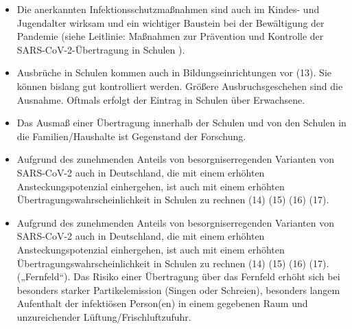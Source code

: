 \documentclass{article}
\begin{document}
\begin{itemize}
\item Die anerkannten Infektionsschutzmaßnahmen sind auch im Kindes- und Jugendalter wirksam und ein wichtiger Baustein bei der Bewältigung der Pandemie (siehe Leitlinie: Maßnahmen zur Prävention und Kontrolle der SARS-CoV-2-Übertragung in Schulen\protect\footnotemark{} ).


\item Ausbrüche in Schulen kommen auch in Bildungseinrichtungen vor (13). Sie können bislang gut kontrolliert werden. Größere Ausbruchsgeschehen sind die Ausnahme. Oftmals erfolgt der Eintrag in Schulen über Erwachsene.


\item Das Ausmaß einer Übertragung innerhalb der Schulen und von den Schulen in die Familien/Haushalte ist Gegenstand der Forschung.


\item Aufgrund des zunehmenden Anteils von besorgniserregenden Varianten von SARS-CoV-2 auch in Deutschland, die mit einem erhöhten Ansteckungspotenzial einhergehen, ist auch mit einem erhöhten Übertragungswahrscheinlichkeit in Schulen zu rechnen (14) (15) (16) (17).


\item Aufgrund des zunehmenden Anteils von besorgniserregenden Varianten von SARS-CoV-2 auch in Deutschland, die mit einem erhöhten Ansteckungspotenzial einhergehen, ist auch mit einem erhöhten Übertragungswahrscheinlichkeit in Schulen zu rechnen (14) (15) (16) (17). („Fernfeld“). Das Risiko einer Übertragung über das Fernfeld erhöht sich bei besonders starker Partikelemission (Singen oder Schreien), besonders langem Aufenthalt der infektiösen Person(en) in einem gegebenen Raum und unzureichender Lüftung/Frischluftzufuhr.


\end{itemize}\addtocounter{footnote}{-1}
\end{document}
